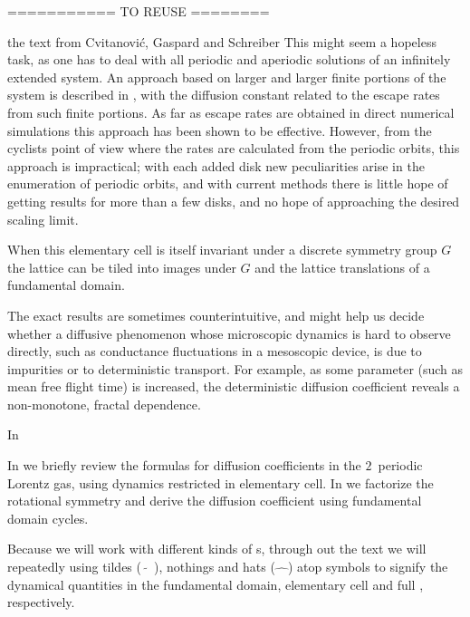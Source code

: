

\bigskip
=========== TO REUSE ========


\bigskip

    {the text from Cvitanovi\'c, Gaspard and Schreiber}
This might seem a hopeless task, as one
has to deal with all periodic and aperiodic
solutions of an infinitely extended system. An
approach based on larger and larger finite portions of the system is described
in , with the diffusion constant related to
the escape rates from such finite portions.
As far as escape rates are obtained in direct numerical simulations
this approach has been shown to be effective.
However, from the cyclists point of view
where the rates are calculated from the periodic orbits,
this approach is impractical; with each added disk new peculiarities arise
in the enumeration of periodic orbits, and with current
methods there is little hope of getting results for more than a few disks,
and no hope of approaching the desired scaling limit.

When this elementary cell is itself invariant under a discrete symmetry
group $G$ the lattice can be tiled into images under $G$ and the lattice
translations of a fundamental domain.

The exact results are sometimes counterintuitive, and might help us
decide whether a diffusive phenomenon whose microscopic dynamics is hard
to observe directly, such as conductance fluctuations in a mesoscopic
device, is due to impurities or to deterministic transport. For example,
as some parameter (such as mean free flight time) is increased, the
deterministic diffusion coefficient reveals a non-monotone, fractal
dependence.

In 

In 
we briefly review the formulas for diffusion
coefficients in the $2$\dmn\ periodic Lorentz gas, using dynamics
restricted in elementary cell.
In  we
factorize the rotational symmetry and derive the diffusion coefficient
using fundamental domain cycles.

Because we will work with different
kinds of \statesp s, through out the text we will repeatedly using tildes
($\tilde{\quad}$), nothings and hats ($\hat{\quad}$) atop symbols to
signify the dynamical quantities in the fundamental domain, elementary
cell and full {\statesp}, respectively.
